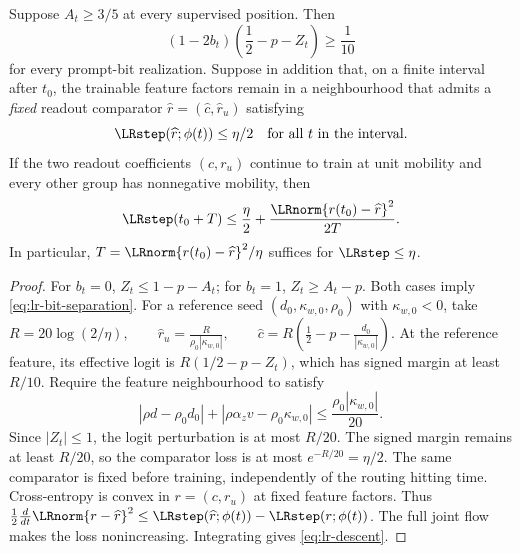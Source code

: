 \begin{lrlemma}
\label{lem:lr-readout-convergence}
Suppose $A_t\ge3/5$ at every supervised position.  Then
\begin{equation}\label{eq:lr-bit-separation}
 (1-2b_t)\left(\frac12-p-Z_t\right)\ge\frac1{10}
\end{equation}
for every prompt-bit realization.  Suppose in addition that, on a
finite interval after $t_0$, the trainable feature factors remain in a
neighbourhood that admits a \emph{fixed} readout comparator
$\widehat r=(\widehat c,\widehat r_u)$ satisfying
\begin{equation}\label{eq:lr-comparator}
 \LRstep(\widehat r;\phi(t))\le\eta/2
 \quad\text{for all }t\text{ in the interval}.
\end{equation}
If the two readout coefficients $(c,r_u)$ continue to train at unit
mobility and every other group has nonnegative mobility, then
\begin{equation}\label{eq:lr-descent}
 \LRstep(t_0+T)\le\frac\eta2+
 \frac{\LRnorm{r(t_0)-\widehat r}^2}{2T}.
\end{equation}
In particular, $T=\LRnorm{r(t_0)-\widehat r}^2/\eta$ suffices for
$\LRstep\le\eta$.
\end{lrlemma}
\begin{proof}
For $b_t=0$, $Z_t\le1-p-A_t$; for $b_t=1$,
$Z_t\ge A_t-p$.  Both cases imply
\eqref{eq:lr-bit-separation}.
For a reference seed $(d_0,\kappa_{w,0},\rho_0)$ with $\kappa_{w,0}<0$, take
 $R=20\log(2/\eta),\qquad \widehat r_u=\frac{R}{\rho_0|\kappa_{w,0}|},\qquad \widehat c=R\left(\frac12-p-\frac{d_0}{|\kappa_{w,0}|}\right).$ 
At the reference feature, its effective logit is
$R(1/2-p-Z_t)$, which has signed margin at least $R/10$.
Require the feature neighbourhood to satisfy
\begin{equation}\label{eq:lr-comparator-stability}
 |\rho d-\rho_0d_0|+|\rho {\alpha_z v}-\rho_0\kappa_{w,0}|
 \le\frac{\rho_0|\kappa_{w,0}|}{20}.
\end{equation}
Since $|Z_t|\le1$, the logit perturbation is at most $R/20$.
The signed margin remains at least $R/20$, so the comparator loss is
at most $e^{-R/20}=\eta/2$. The same comparator is fixed before training,
independently of the routing hitting time.
Cross-entropy is convex in $r=(c,r_u)$ at fixed feature factors.  Thus
$\frac12\frac{d}{dt}\LRnorm{r-\widehat r}^2
\le\LRstep(\widehat r;\phi(t))-\LRstep(r;\phi(t))$.
The full joint flow makes the loss nonincreasing.  Integrating gives
\eqref{eq:lr-descent}.
\end{proof}

